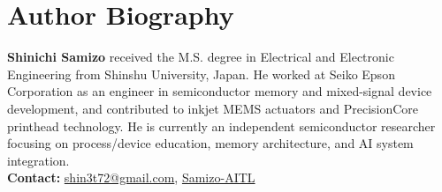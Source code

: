 \documentclass[conference]{IEEEtran}
\begin{document}
\section*{Author Biography}
\noindent\textbf{Shinichi Samizo} received the M.S. degree in Electrical and Electronic Engineering from Shinshu University, Japan. He worked at Seiko Epson Corporation as an engineer in semiconductor memory and mixed-signal device development, and contributed to inkjet MEMS actuators and PrecisionCore printhead technology. He is currently an independent semiconductor researcher focusing on process/device education, memory architecture, and AI system integration.\\[2pt]
\textbf{Contact:} \href{mailto:shin3t72@gmail.com}{shin3t72@gmail.com}, \href{https://github.com/Samizo-AITL}{Samizo-AITL}
\end{document}
